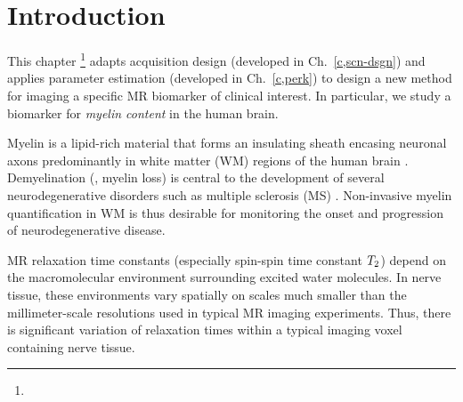
\section{Introduction}
\label{s,mwf,intro}

This chapter
\footnote{%
%
} 
adapts acquisition design 
(developed in Ch.~\ref{c,scn-dsgn})
and applies parameter estimation 
(developed in Ch.~\ref{c,perk})
to design a new method
for imaging a specific MR biomarker
of clinical interest.
In particular,
we study a biomarker 
for \emph{myelin content} 
in the human brain.

Myelin is a lipid-rich material
that forms an insulating sheath
encasing neuronal axons 
predominantly in white matter (WM) regions
of the human brain
\cite{morell:84}.
Demyelination (\ie, myelin loss) is central
to the development 
of several neurodegenerative disorders
such as multiple sclerosis (MS)
\cite{goldenberg:12:msr}. 
Non-invasive myelin quantification in WM
is thus desirable 
for monitoring the onset and progression
of neurodegenerative disease.

MR relaxation time constants
(especially spin-spin time constant $T_2$)
depend on the macromolecular environment
surrounding excited water molecules.
In nerve tissue,
these environments vary spatially
on scales much smaller 
than the millimeter-scale resolutions
used in typical MR imaging experiments.
Thus, 
there is significant variation
of relaxation times 
within a typical imaging voxel 
containing nerve tissue.


